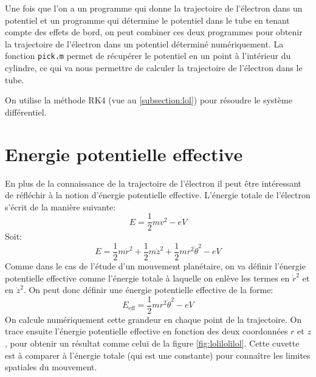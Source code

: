 \documentclass[a4paper,12pt]{article}
\begin{document}
Une fois que l'on a un programme qui donne la trajectoire de l'électron dans un potentiel et un programme qui détermine le potentiel dans le tube en tenant compte des effets de bord, on peut combiner ces deux programmes pour obtenir la trajectoire de l'électron dans un potentiel déterminé numériquement. La fonction \verb|pick.m| permet de récupérer le potentiel en un point à l'intérieur du cylindre, ce qui va nous permettre de calculer la trajectoire de l'électron dans le tube.

On utilise la méthode RK4 (vue au \ref{subsection:lol}) pour résoudre le système différentiel.

\section{Energie potentielle effective}

En plus de la connaissance de la trajectoire de l'électron il peut être intéressant de réfléchir à la notion d'énergie potentielle effective. L'énergie totale de l'électron s'écrit de la manière suivante:
\[
E = \frac 1 2 mv^2 - eV
\]
Soit:
\[
E = \frac 1 2 m \dot{r}^2 + \frac 1 2 m \dot{z}^2 + \frac 1 2 m r^2 \dot{\theta}^2 - e V
\]
Comme dans le cas de l'étude d'un mouvement planétaire, on va définir l'énergie potentielle effective comme l'énergie totale à laquelle on enlève les termes en $\dot{r}^2$ et en $\dot{z}^2$. On peut donc définir une énergie potentielle effective de la forme:
\[
E_{\mathrm{eff}} = \frac 1 2 m r^2 \dot{\theta}^2 -e V
\]
On calcule numériquement cette grandeur en chaque point de la trajectoire. On trace ensuite l'énergie potentielle effective en fonction des deux coordonnées $r$ et $z$, pour obtenir un résultat comme celui de la figure \ref{fig:lolilolilol}. Cette cuvette est à comparer à l'énergie totale (qui est une constante) pour connaître les limites spatiales du mouvement.
\end{document}
